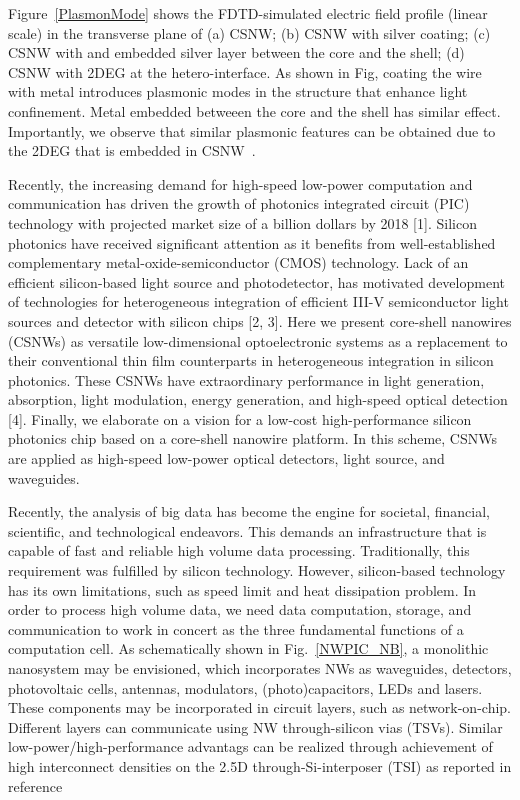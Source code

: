 Figure~\ref{PlasmonMode} shows the FDTD-simulated electric field profile (linear scale) in the
transverse plane of (a) CSNW; (b) CSNW with silver coating; (c) CSNW with and
embedded silver layer between the core and the shell; (d) CSNW with 2DEG at the
hetero-interface. As shown in Fig, coating the wire with metal introduces
plasmonic modes in the structure that enhance light confinement. Metal embedded
betweeen the core and the shell has similar effect. Importantly, we observe
that similar plasmonic features can be obtained due to the 2DEG that is
embedded in CSNW~\cite{montazeri2016plasmonic}.

Recently, the increasing demand for high-speed low-power computation and
communication has driven the growth of photonics integrated circuit
(PIC) technology with projected market size of a billion dollars by 2018
{[}1{]}. Silicon photonics have received significant attention as it
benefits from well-established complementary metal-oxide-semiconductor
(CMOS) technology. Lack of an efficient silicon-based light source and
photodetector, has motivated development of technologies for
heterogeneous integration of efficient III-V semiconductor light sources
and detector with silicon chips {[}2, 3{]}. Here we present core-shell
nanowires (CSNWs) as versatile low-dimensional optoelectronic systems as
a replacement to their conventional thin film counterparts in
heterogeneous integration in silicon photonics. These CSNWs have
extraordinary performance in light generation, absorption, light
modulation, energy generation, and high-speed optical detection {[}4{]}.
Finally, we elaborate on a vision for a low-cost high-performance
silicon photonics chip based on a core-shell nanowire platform. In this
scheme, CSNWs are applied as high-speed low-power optical detectors,
light source, and waveguides.

Recently, the analysis of big data has become the engine for societal,
financial, scientific, and technological endeavors. This demands an
infrastructure that is capable of fast and reliable high volume data
processing. Traditionally, this requirement was fulfilled by silicon
technology. However, silicon-based technology has its own limitations, such as
speed limit and heat dissipation problem. In order to process high volume data,
we need data computation, storage, and communication to work in concert as the
three fundamental functions of a computation cell. As schematically shown in
Fig.~\ref{NWPIC_NB}, a monolithic nanosystem may be envisioned, which
incorporates NWs as waveguides, detectors, photovoltaic cells, antennas,
modulators, (photo)capacitors, LEDs and lasers. These components may be
incorporated in circuit layers, such as network-on-chip. Different layers can
communicate using NW through-silicon vias (TSVs). Similar
low-power/high-performance advantags can be realized through achievement of
high interconnect densities on the 2.5D through-Si-interposer (TSI) as reported
in reference~\cite{Zhang:2015ec} 

